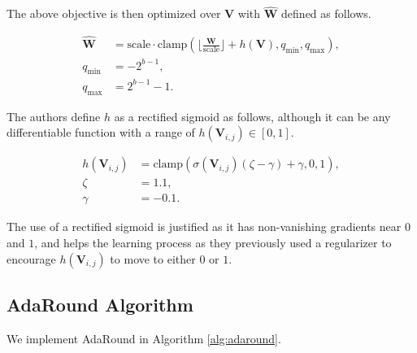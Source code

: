 \documentclass[../main.tex]{subfiles}
\begin{document}
The above objective is then optimized over $\mathbf{V}$ with $\hat{\mathbf{W}}$ defined as follows.

\begin{align}
\hat{\mathbf{W}} &= \text{scale} \cdot \text{clamp} \left( \lfloor \frac{\mathbf{W}}{\text{scale}} \rfloor +h(\mathbf{V}), q_\text{min}, q_\text{max}\right), \\ 
q_\text{min} &= -2^{b-1}, \\
q_\text{max} &= 2^{b-1}-1.
\end{align}

The authors define $h$ as a rectified sigmoid as follows, although it can be any differentiable function with a range of $h(\mathbf{V}_{i,j}) \in [0, 1]$.

\begin{align}
h(\mathbf{V}_{i,j}) &= \text{clamp}\left( \sigma(\mathbf{V}_{i, j}) (\zeta - \gamma) + \gamma, 0, 1\right), \\
\zeta &= 1.1, \\
\gamma &= -0.1.
\end{align}

The use of a rectified sigmoid is justified as it has non-vanishing gradients near $0$ and $1$, and helps the learning process as they previously used a regularizer to encourage $h(\mathbf{V}_{i, j})$ to move to either $0$ or $1$.

\subsection{AdaRound Algorithm}
We implement AdaRound in Algorithm \ref{alg:adaround}.
\end{document}
